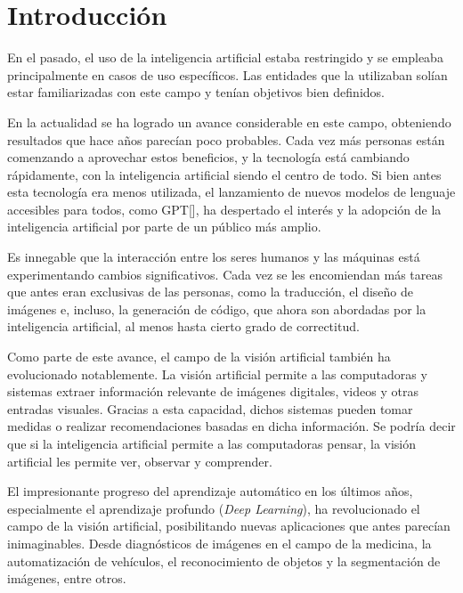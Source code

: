 \chapter*{Introducci\'on}\label{chapter:introduction}
En el pasado, el uso de la inteligencia artificial estaba restringido y se empleaba principalmente en casos de uso espec\'ificos. Las entidades que la utilizaban sol\'ian estar familiarizadas con este campo y ten\'ian objetivos bien definidos.

En la actualidad se ha logrado un avance considerable en este campo, obteniendo resultados que hace a\~nos parec\'ian poco probables. Cada vez m\'as personas est\'an comenzando a aprovechar estos beneficios, y la tecnolog\'ia est\'a cambiando r\'apidamente, con la inteligencia artificial siendo el centro de todo. Si bien antes esta tecnolog\'ia era menos utilizada,  el lanzamiento de nuevos modelos de lenguaje accesibles para todos, como GPT[\cite{gpt2}], ha despertado el inter\'es y la adopci\'on de la inteligencia artificial por parte de un p\'ublico m\'as amplio.

Es innegable que la interacci\'on entre los seres humanos y las m\'aquinas est\'a experimentando cambios significativos. Cada vez se les encomiendan m\'as tareas que antes eran exclusivas de las personas, como la traducci\'on, el dise\~no de im\'agenes e, incluso, la generaci\'on de c\'odigo, que ahora son abordadas por la inteligencia artificial, al menos hasta cierto grado de correctitud.

Como parte de este avance, el campo de la visi\'on artificial tambi\'en ha evolucionado notablemente. La visi\'on artificial permite a las computadoras y sistemas extraer informaci\'on relevante de im\'agenes digitales, videos y otras entradas visuales. Gracias a esta capacidad, dichos sistemas pueden tomar medidas o realizar recomendaciones basadas en dicha informaci\'on. Se podr\'ia decir que si la inteligencia artificial permite a las computadoras pensar, la visi\'on artificial les permite ver, observar y comprender.

El impresionante progreso del aprendizaje autom\'atico en los \'ultimos a\~nos, especialmente el aprendizaje profundo (\textit{Deep Learning}), ha revolucionado el campo de la visi\'on artificial, posibilitando nuevas aplicaciones que antes parec\'ian inimaginables. Desde diagn\'osticos de im\'agenes en el campo de la medicina, la automatizaci\'on de veh\'iculos, el reconocimiento de objetos y la segmentaci\'on de im\'agenes, entre otros.

